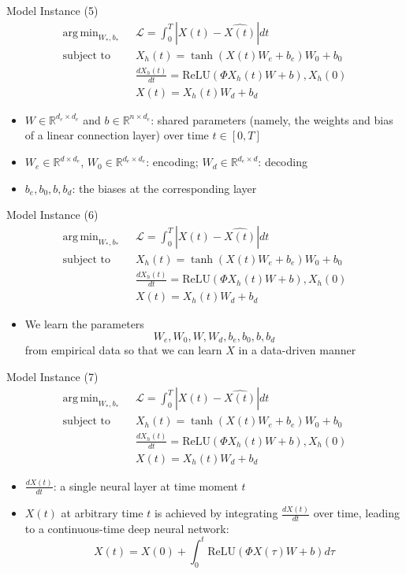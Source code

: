 \documentclass{beamer}
\DeclareMathOperator*{\argmin}{arg\,min}
\begin{document}
\begin{frame}{Model Instance (5)}\[
\begin{split}
\argmin_{W_*,b_*}\text{ }&\mathcal{L}=\int_0^T|X(t)-\hat{X(t)}|dt\\
\text{subject to }&X_h(t)=\tanh(X(t)W_e+b_e)W_0+b_0\\
&\frac{dX_h(t)}{dt}=\text{ReLU}(\Phi X_h(t)W+b),X_h(0)\\
&X(t)=X_h(t)W_d+b_d
\end{split}
\]
\begin{itemize}
\item $W\in\mathbb{R}^{d_e\times d_e}$ and $b\in\mathbb{R}^{n\times d_e}$: shared parameters (namely, the weights and bias of a linear connection layer) over time $t\in[0,T]$
\item $W_e\in\mathbb{R}^{d\times d_e}$, $W_0\in\mathbb{R}^{d_e\times d_e}$: encoding; $W_d\in\mathbb{R}^{d_e\times d}$: decoding
\item $b_e,b_0,b,b_d$: the biases at the corresponding layer
\end{itemize}
\end{frame}

\begin{frame}{Model Instance (6)}\[
\begin{split}
\argmin_{W_*,b_*}\text{ }&\mathcal{L}=\int_0^T|X(t)-\hat{X(t)}|dt\\
\text{subject to }&X_h(t)=\tanh(X(t)W_e+b_e)W_0+b_0\\
&\frac{dX_h(t)}{dt}=\text{ReLU}(\Phi X_h(t)W+b),X_h(0)\\
&X(t)=X_h(t)W_d+b_d
\end{split}
\]
\begin{itemize}
\item We learn the parameters\[
W_e,W_0,W,W_d,b_e,b_0,b,b_d
\]from empirical data so that we can learn $X$ in a data-driven manner
\end{itemize}
\end{frame}


\begin{frame}{Model Instance (7)}\[
\begin{split}
\argmin_{W_*,b_*}\text{ }&\mathcal{L}=\int_0^T|X(t)-\hat{X(t)}|dt\\
\text{subject to }&X_h(t)=\tanh(X(t)W_e+b_e)W_0+b_0\\
&\frac{dX_h(t)}{dt}=\text{ReLU}(\Phi X_h(t)W+b),X_h(0)\\
&X(t)=X_h(t)W_d+b_d
\end{split}
\]
\begin{itemize}
\item $\frac{dX(t)}{dt}$: a single neural layer at time moment $t$
\item $X(t)$ at arbitrary time $t$ is achieved by integrating $\frac{dX(t)}{dt}$ over time, leading to a continuous-time deep neural network:\[
X(t)=X(0)+\int_0^t\text{ReLU}(\Phi X(\tau)W+b)d\tau
\]
\end{itemize}
\end{frame}
\end{document}

